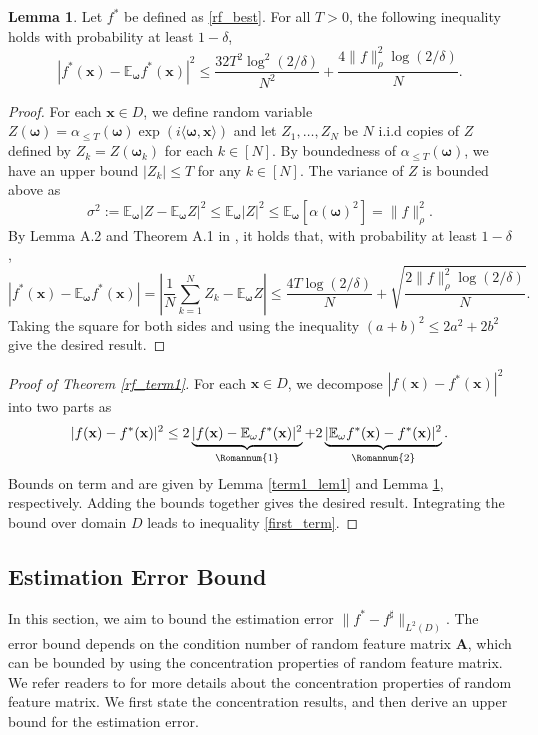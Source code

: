 \documentclass[11pt,twoside]{article}
\theoremstyle{plain}
\theoremstyle{definition}
\newtheorem{lemma}{Lemma}[section]
\theoremstyle{remark}
\newcommand{\E}{\mathbb{E}}
\newcommand{\Ab}{\mathbf{A}}
\newcommand{\xb}{\mathbf{x}}
\newcommand{\omegab}{\boldsymbol\omega}
\begin{document}
\begin{lemma}
\label{term1_lem2}
Let $f^*$ be defined as \eqref{rf_best}. For all $T>0$, the following inequality holds with probability at least $1-\delta$,
\begin{equation}
\left|f^*(\xb) - \E_{\omegab} f^*(\xb) \right|^2 \leq \frac{32T^2\log^2(2/\delta)}{N^2} + \frac{4\|f\|^2_\rho\log(2/\delta)}{N}.
\end{equation}
\end{lemma}
\begin{proof}
For each $\xb\in D$, we define random variable $Z(\omegab) = \alpha_{\leq T}(\omegab)\exp(i\langle \omegab,\xb\rangle)$ and let $Z_1, \dots, Z_N$ be $N$ i.i.d copies of $Z$ defined by $Z_k = Z(\omegab_k)$ for each $k\in[N]$.
By boundedness of $\alpha_{\leq T}(\omegab)$, we have an upper bound $|Z_k| \leq T$ for any $k\in[N]$. The variance of $Z$ is bounded above as
$$
\sigma^2 := \E_{\omegab} |Z-\E_{\omegab} Z|^2 \leq \E_{\omegab} |Z|^2 \leq \E_{\omegab} [\alpha(\omegab)^2] = \|f\|^2_\rho. 
$$
By Lemma A.2 and Theorem A.1 in \cite{lanthaler2023error}, it holds that, with probability at least $1-\delta$,
\begin{equation*}
\left|f^*(\xb) - \E_{\omegab} f^*(\xb) \right| = \left|\frac{1}{N}\sum_{k=1}^N Z_k - \E_{\omegab} Z \right| \leq \frac{4T\log(2/\delta)}{N} + \sqrt{\frac{2\|f\|^2_\rho\log(2/\delta)}{N}}.
\end{equation*}
Taking the square for both sides and using the inequality $(a+b)^2\leq 2a^2+2b^2$ give the desired result.
\end{proof}
\begin{proof}[Proof of Theorem \ref{rf_term1}]
For each $\xb\in D$, we decompose $|f(\xb) - f^*(\xb)|^2$ into two parts as
\begin{equation}
|f(\xb) - f^*(\xb)|^2 \leq 2 \underbrace{|f(\xb) - \E_\omega f^*(\xb)|^2}_{{\rm \Romannum{1}}} + 2 \underbrace{|\E_\omega f^*(\xb) - f^*(\xb)|^2}_{ {\rm \Romannum{2}} }.
\end{equation}
Bounds on term  and  are given by Lemma \ref{term1_lem1} and Lemma \ref{term1_lem2}, respectively. Adding the bounds together gives the desired result. 
Integrating the bound over domain $D$ leads to inequality \eqref{first_term}.
\end{proof}

\subsection{Estimation Error Bound}
In this section, we aim to bound the estimation error $\|f^*-f^\sharp\|_{L^2(D)}$. The error bound depends on the condition number of random feature matrix $\Ab$, which can be bounded by using the concentration properties of random feature matrix. We refer readers to \cite{chen2022concentration, chen2024conditioning} for more details about the concentration properties of random feature matrix. We first state the concentration results, and then derive an upper bound for the estimation error. 
\end{document}
